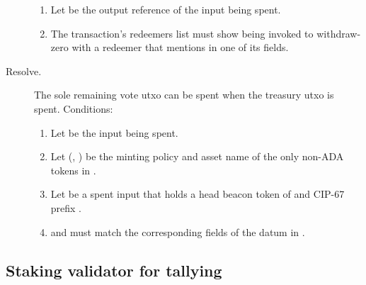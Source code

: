 \documentclass[../hydrozoa.tex]{subfiles}
\begin{document}
\begin{description}
\begin{enumerate}
      \item Let  be the output reference of the input being spent.
      \item The transaction's redeemers list must show  being invoked to withdraw-zero with a redeemer that mentions  in one of its fields.
    \end{enumerate}
  \item[Resolve.] The sole remaining vote utxo can be spent when the treasury utxo is spent.
    Conditions:
    \begin{enumerate}
      \item Let  be the input being spent.
      \item Let (, ) be the minting policy and asset name of the only non-ADA tokens in .
      \item Let  be a spent input that holds a head beacon token of  and CIP-67 prefix \headBeaconToken{}.
      \item {} and  must match the corresponding fields of the  datum in .
\end{enumerate}
\end{description}

\subsection{Staking validator for tallying}
\end{document}
